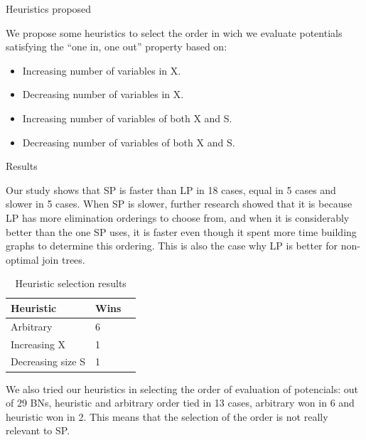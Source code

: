 \documentclass[final]{beamer}
\newlength{\onecolwid}
\newlength{\twocolwid}
\begin{document}
\begin{frame}[t]
\begin{columns}[t]
\begin{column}{\twocolwid}
\begin{columns}[t,totalwidth=\twocolwid]
\begin{column}{\onecolwid}
\begin{block}{Heuristics proposed}

We propose some heuristics to select the order in wich we evaluate potentials satisfying the “one in, one out” property based on:

\begin{itemize}

\item Increasing number of variables in X.
\item Decreasing number of variables in X.
\item Increasing number of variables of both X and S.
\item Decreasing number of variables of both X and S.

\end{itemize}

\end{block}

\begin{block}{Results}

Our study shows that SP is faster than LP in 18 cases, equal in 5 cases and slower in 5 cases. When SP is slower, further research showed that it is because LP has more elimination orderings to choose from, and when it is considerably better than the one SP uses, it is faster even though it spent more time building graphs to determine this ordering. This is also the case why LP is better for non-optimal join trees.

\begin{table}
\vspace{2ex}
\begin{tabular}{l l l}
\toprule
\textbf{Heuristic} & \textbf{Wins} \\
\midrule
Arbitrary & 6 \\
Increasing X & 1 \\
Decreasing size S & 1 \\
\bottomrule
\end{tabular}
\caption{Heuristic selection results}
\end{table}

We also tried our heuristics in selecting the order of evaluation of potencials: out of 29 BNs, heuristic and arbitrary order tied in 13 cases, arbitrary won in 6 and heuristic won in 2. This means that the selection of the order is not really relevant to SP.

\end{block}



\end{column}
\end{columns}
\end{column}
\end{columns}
\end{frame}
\end{document}
